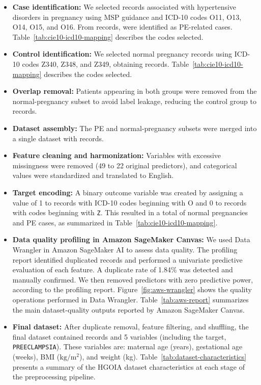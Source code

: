 \documentclass[diagnostics,article,submit,pdftex,moreauthors]{Definitions/mdpi}
\begin{document}
\begin{itemize}
\item \textbf{Case identification:} We selected records associated with
  hypertensive disorders in pregnancy using \ac{MSP} guidance and
  \ac{ICD-10} codes O11, O13, O14, O15, and O16. From
   records,  were identified as
  \ac{PE}-related cases. Table~\ref{tab:cie10-icd10-mapping}
  describes the codes selected.

\item \textbf{Control identification:} We selected normal pregnancy
  records using \ac{ICD-10} codes Z340, Z348, and Z349, obtaining
   records. Table~\ref{tab:cie10-icd10-mapping}
  describes the codes selected.

\item \textbf{Overlap removal:} Patients appearing in both groups were
  removed from the normal-pregnancy subset to avoid label leakage,
  reducing the control group to  records.

\item \textbf{Dataset assembly:} The \ac{PE} and normal-pregnancy
  subsets were merged into a single dataset with 
  records.

\item \textbf{Feature cleaning and harmonization:} Variables with
  excessive missingness were removed (49 to 22 original predictors),
  and categorical values were standardized and translated to English.

\item \textbf{Target encoding:} A binary outcome variable was created
  by assigning a value of 1 to records with \ac{ICD-10} codes
  beginning with O and 0 to records with codes beginning with
  \texttt{Z}. This resulted in a total of  normal
  pregnancies and  \ac{PE} cases, as summarized in
  Table~\ref{tab:cie10-icd10-mapping}.

\item \textbf{Data quality profiling in Amazon SageMaker Canvas:} We used
  Data Wrangler in Amazon SageMaker AI to assess data quality. The profiling
  report identified duplicated records and performed a univariate
  predictive evaluation of each feature. A duplicate rate of 1.84\%
  was detected and manually confirmed. We then removed predictors with
  zero predictive power, according to the profiling report.
  Figure~\ref{fig:aws-wrangler} shows the quality operations performed
  in Data Wrangler. Table~\ref{tab:aws-report} summarizes the main
  dataset-quality outputs reported by Amazon SageMaker Canvas.

\item \textbf{Final dataset:} After duplicate removal, feature
  filtering, and shuffling, the final dataset contained
   records and 5 variables (including the target,
  \texttt{PREECLAMPSIA}). These variables are: maternal age (years),
  gestational age (weeks), \ac{BMI} ($\text{kg}/\text{m}^2$), and
  weight (kg). Table~\ref{tab:dataset-characteristics}
    presents a summary of the \ac{HGOIA} dataset characteristics at
    each stage of the preprocessing pipeline.
\end{itemize}
\end{document}
